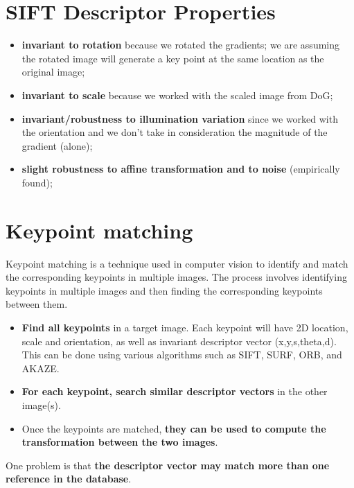 \documentclass{article}
\begin{document}
\newpage

\section*{SIFT Descriptor Properties}

\begin{itemize}
    \item \textbf{invariant to rotation} because we rotated the gradients; we are assuming the rotated image will generate a key point at the same location as the original image;
    \item \textbf{invariant to scale} because we worked with the scaled image from DoG;
    \item \textbf{invariant/robustness to illumination variation} since we worked with the orientation and we don’t take in consideration the magnitude of the gradient (alone);
    \item \textbf{slight robustness to affine transformation and to noise} (empirically found);
\end{itemize}

\newpage

\section*{Keypoint matching}

Keypoint matching is a technique used in computer vision to identify and match the corresponding keypoints in multiple images. The process involves identifying keypoints in multiple images and then finding the corresponding keypoints between them. 

\begin{itemize}
    \item \textbf{Find all keypoints} in a target image. Each keypoint will have 2D location, scale and orientation, as well as invariant descriptor vector (x,y,s,theta,d). This can be done using various algorithms such as SIFT, SURF, ORB, and AKAZE.
    \item \textbf{For each keypoint, search similar descriptor vectors} in the other image(s).
    \item Once the keypoints are matched, \textbf{they can be used to compute the transformation between the two images}. 
\end{itemize}

One problem is that \textbf{the descriptor vector may match more than one reference in the database}.
\end{document}
